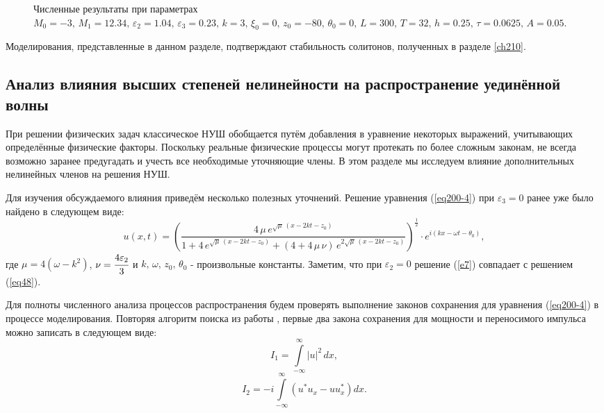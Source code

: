 \documentclass[14pt,a4paper]{extreport}
\begin{document}
\begin{figure}[H]
\begin{center}
\begin{minipage}[h]{0.48\linewidth}
					\end{minipage}
				\end{center}
				\caption{Численные результаты при параметрах \(M_{0}=-3,\,M_{1}=12.34,\,\varepsilon_{2}=1.04,\,\varepsilon_{3}=0.23,\, k=3,\, \xi_{0}=0,\,z_{0}=-80,\, \theta_{0}=0,\, L=300,\, T=32,\, h=0.25,\, \tau=0.0625,\,A=0.05\).}
				\label{fig172}
			\end{figure}

			Моделирования, представленные в данном разделе, подтверждают стабильность солитонов, полученных в разделе \ref{ch210}.
			\subsection{Анализ влияния высших степеней нелинейности на распространение уединённой волны}\label{ch340}
			При решении физических задач классическое НУШ обобщается путём добавления в уравнение некоторых выражений, учитывающих определённые физические факторы. Поскольку реальные физические процессы могут протекать по более сложным законам, не всегда возможно заранее предугадать и учесть все необходимые уточняющие члены. В этом разделе мы исследуем влияние дополнительных нелинейных членов на решения НУШ. 
			
			Для изучения обсуждаемого влияния приведём несколько полезных уточнений.
			Решение уравнения (\ref{eq200-4}) при \(\varepsilon_{3}=0\) ранее уже было найдено в следующем виде:
			\begin{equation}\label{e7}
				u(x,t)=\left(\frac{4\,\mu\, e^{\sqrt{\mu}\,(x-2kt-z_{0})}}{1+4\, e^{\sqrt{\mu}\,(x-2kt-z_{0})}+(4+4\, \mu\, \nu) \,e^{2\sqrt{\mu}\,(x-2kt-z_{0})}}\right)^{\frac{1}{2}}\cdot e^{i(kx-\omega t-\theta_{0})},
			\end{equation}
			где \(\mu=4(\omega-k^{2})\), \(\nu=\cfrac{4 \varepsilon_{2}}{3}\) и \( k,\, \omega,\, z_{0},\, \theta_{0}\) - произвольные константы. Заметим, что при \(\varepsilon_{2}=0\) решение (\ref{e7}) совпадает с решением (\ref{eq48}).

			Для полноты численного анализа процессов распространения будем проверять выполнение законов сохранения для уравнения (\ref{eq200-4}) в процессе моделирования. Повторяя алгоритм поиска из работы \cite{KudrNifHierarchy}, первые два закона сохранения для мощности и переносимого импульса можно записать в следующем виде:
			\begin{equation}\label{eq320-2}
				I_{1}=\int\limits_{-\infty}^{\infty} |u|^{2} \, dx,
			\end{equation}
			\begin{equation}\label{eq320-3}
				I_{2}=-i \int\limits_{-\infty}^{\infty}\left(u^{*}u_{x}-u u^{*}_{x}\right) dx.
			\end{equation}
\end{document}
